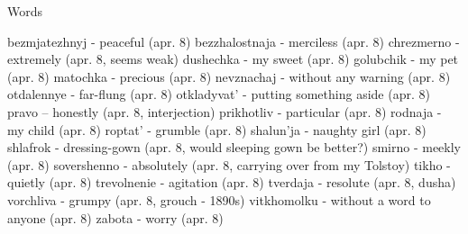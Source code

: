 Words

bezmjatezhnyj - peaceful (apr. 8)
bezzhalostnaja - merciless (apr. 8)
chrezmerno - extremely (apr. 8, seems weak)
dushechka - my sweet (apr. 8)
golubchik - my pet (apr. 8)
matochka - precious (apr. 8)
nevznachaj - without any warning (apr. 8)
otdalennye - far-flung (apr. 8)
otkladyvat' - putting something aside (apr. 8)
pravo -- honestly (apr. 8, interjection)
prikhotliv - particular (apr. 8)
rodnaja - my child (apr. 8)
roptat' - grumble (apr. 8)
shalun'ja - naughty girl (apr. 8)
shlafrok - dressing-gown (apr. 8, would sleeping gown be better?)
smirno - meekly (apr. 8)
sovershenno - absolutely (apr. 8, carrying over from my Tolstoy)
tikho - quietly (apr. 8)
trevolnenie - agitation (apr. 8)
tverdaja - resolute (apr. 8, dusha)
vorchliva - grumpy (apr. 8, grouch - 1890s)
vitkhomolku - without a word to anyone (apr. 8)
zabota - worry (apr. 8)